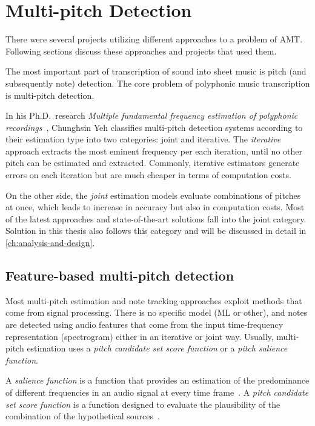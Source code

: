 \section{Multi-pitch Detection}\label{sec:multi-pitch-detection}
There were several projects utilizing different approaches to a problem of \ac{AMT}. Following sections discuss these
approaches and projects that used them.

The most important part of transcription of sound into sheet music is pitch (and subsequently note) detection. The core
problem of polyphonic music transcription is multi-pitch detection.

In his Ph.D.\ research \textit{Multiple fundamental frequency estimation of polyphonic recordings}~\cite{fundamental-frequency-estimation},
Chunghsin Yeh classifies multi-pitch detection systems according to their estimation type into two categories: joint and
iterative. The \textit{iterative} approach extracts the most eminent frequency per each iteration, until no other pitch
can be estimated and extracted. Commonly, iterative estimators generate errors on each iteration but are much cheaper in
terms of computation costs.

On the other side, the \textit{joint} estimation models evaluate combinations of pitches at once, which leads to
increase in accuracy but also in computation costs. Most of the latest approaches and state-of-the-art solutions fall
into the joint category. Solution in this thesis also follows this category and will be discussed in detail in \cref{ch:analysis-and-design}.

\subsection{Feature-based multi-pitch detection}\label{subsec:feature-based-multi-pitch-detection}
Most multi-pitch estimation and note tracking approaches exploit methods that come from signal processing. There is no
specific model (\ac{ML} or other), and notes are detected using audio features that come from the input time-frequency
representation (spectrogram) either in an iterative or joint way. Usually, multi-pitch estimation uses a \textit{pitch
candidate set score function} or a \textit{pitch salience function}.

A \textit{salience function} is a function that provides an estimation of the predominance of different frequencies in
an audio signal at every time frame~\cite{pitch-salience-function}. A \textit{pitch candidate set score function} is
a function designed to evaluate the plausibility of the combination of the hypothetical sources~\cite{fundamental-frequency-estimation}.

